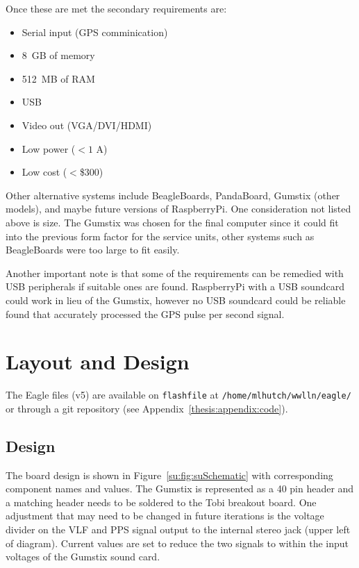 Once these are met the secondary requirements are:

\begin{itemize}
\item{Serial input (GPS comminication)}
\item{8~GB of memory}
\item{512~MB of RAM}
\item{USB}
\item{Video out (VGA/DVI/HDMI)}
\item{Low power ($<1$ A)}
\item{Low cost ($<$\$300)}
\end{itemize}

Other alternative systems include BeagleBoards, PandaBoard, Gumstix (other models), and maybe future versions of RaspberryPi.
One consideration not listed above is size.
The Gumstix was chosen for the final computer since it could fit into the previous form factor for the service units, other systems such as BeagleBoards were too large to fit easily.

Another important note is that some of the requirements can be remedied with USB peripherals if suitable ones are found.
RaspberryPi with a USB soundcard could work in lieu of the Gumstix, however no USB soundcard could be reliable found that accurately processed the GPS pulse per second signal.

\section{Layout and Design}

The Eagle files (v5) are available on \texttt{flashfile} at \texttt{/home/mlhutch/wwlln/eagle/} or through a git repository (see Appendix~\ref{thesis:appendix:code}). 

\subsection{Design}

The board design is shown in Figure~\ref{su:fig:suSchematic} with corresponding component names and values.
The Gumstix is represented as a 40 pin header and a matching header needs to be soldered to the Tobi breakout board.
One adjustment that may need to be changed in future iterations is the voltage divider on the VLF and PPS signal output to the internal stereo jack (upper left of diagram).
Current values are set to reduce the two signals to within the input voltages of the Gumstix sound card.

